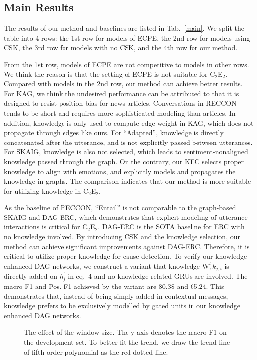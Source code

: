 \documentclass{article}
\begin{document}
\subsection{Main Results}

The results of our method and baselines are listed in Tab.~\ref{main}. We split the table into 4 rows: the 1st row for models of ECPE, the 2nd row for models using CSK, the 3rd row for models with no CSK, and the 4th row for our method. 

From the 1st row, models of ECPE are not competitive to models in other rows. We think the reason is that the setting of ECPE is not suitable for C$_2$E$_2$. Compared with models in the 2nd row, our method can achieve better results. For KAG, we think the undesired performance can be attributed to that it is designed to resist position bias for news articles. Conversations in RECCON tends to be short and requires more sophisticated modeling than articles. In addition, knowledge is only used to compute edge weight in KAG, which does not propagate through edges like ours. For ``Adapted'', knowledge is directly concatenated after the utterance, and is not explicitly passed between utterances. For SKAIG, knowledge is also not selected, which leads to sentiment-nonaligned knowledge passed through the graph. On the contrary, our KEC selects proper knowledge to align with emotions, and explicitly models and propagates the knowledge in graphs. The comparison indicates that our method is more suitable for utilizing knowledge in C$_2$E$_2$. 


As the baseline of RECCON, ``Entail'' is not comparable to the graph-based SKAIG and DAG-ERC, which demonstrates that explicit modeling of utterance interactions is critical for C$_2$E$_2$. DAG-ERC is the SOTA baseline for ERC with no knowledge involved. By introducing CSK and the knowledge selection, our method can achieve significant improvements against DAG-ERC. Therefore, it is critical to utilize proper knowledge for cause detection. To verify our knowledge enhanced DAG networks, we construct a variant that knowledge $\mathrm{W}_{\mathrm{k}}^{l}k_{j,i}$ is directly added on $h_j^l$ in eq.~4 and no knowledge-related GRUs are involved. The macro F1 and Pos. F1 achieved by the variant are 80.38 and 65.24. This demonstrates that, instead of being simply added in contextual messages, knowledge prefers to be exclusively modelled by gated units in our knowledge enhanced DAG networks. 

\begin{figure}
    \centering
    \vspace{-0.3cm}
    \vspace{-0.2cm}
    \caption{The effect of the window size. The y-axis denotes the macro F1 on the development set. To better fit the trend, we draw the trend line of fifth-order polynomial as the red dotted line. }
    \vspace{-0.2cm}
    \label{window}
\end{figure}
\end{document}
